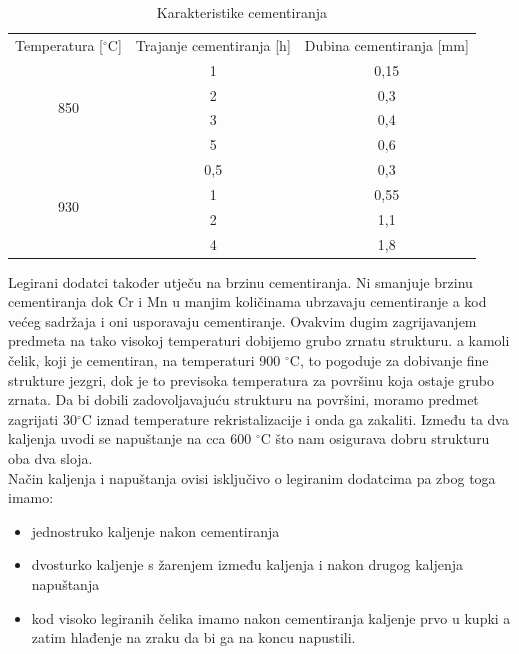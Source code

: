 \documentclass[a4paper,12pt]{article}
\numberwithin{figure}{section}
\begin{document}
\begin{table}[!h]
\centering
\caption{Karakteristike cementiranja}
\label{my-label}
\begin{tabular}{ccc}
Temperatura {[}$^{\circ}$C{]}   & Trajanje cementiranja {[}h{]} & Dubina cementiranja {[}mm{]} \\
\multirow{4}{*}{850} & 1                             & 0,15                         \\
                     & 2                             & 0,3                          \\
                     & 3                             & 0,4                          \\
                     & 5                             & 0,6                          \\
\multirow{4}{*}{930} & 0,5                           & 0,3                          \\
                     & 1                             & 0,55                         \\
                     & 2                             & 1,1                          \\
                     & 4                             & 1,8                         
\end{tabular}
\end{table}
\FloatBarrier
Legirani dodatci također utječu na brzinu cementiranja. Ni smanjuje brzinu cementiranja dok Cr i Mn u manjim količinama ubrzavaju cementiranje a kod većeg sadržaja i oni usporavaju cementiranje. Ovakvim dugim zagrijavanjem predmeta na tako visokoj temperaturi dobijemo grubo zrnatu strukturu. a kamoli čelik, koji je cementiran, na temperaturi 900 $^{\circ}$C, to pogoduje za dobivanje fine strukture jezgri, dok je to previsoka temperatura za površinu koja ostaje grubo zrnata. Da bi dobili zadovoljavajuću strukturu na površini, moramo predmet zagrijati 30$^{\circ}$C iznad temperature rekristalizacije i onda ga zakaliti. Između ta dva kaljenja uvodi se napuštanje na cca 600 $^{\circ}$C što nam osigurava dobru strukturu oba dva sloja. \\
Način kaljenja i napuštanja ovisi isključivo o legiranim dodatcima pa zbog toga imamo:
\begin{itemize}
\item jednostruko kaljenje nakon cementiranja
\item dvosturko kaljenje s žarenjem između kaljenja i nakon drugog kaljenja napuštanja
\item kod visoko legiranih čelika imamo nakon cementiranja kaljenje prvo u kupki a zatim hlađenje na zraku da bi ga na koncu napustili.
\end{itemize}
\end{document}
